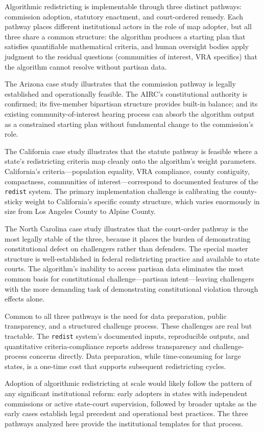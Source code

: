 \label{sec:conclusion}

Algorithmic redistricting is implementable through three distinct pathways:
commission adoption, statutory enactment, and court-ordered remedy.  Each
pathway places different institutional actors in the role of map adopter, but
all three share a common structure: the algorithm produces a starting plan
that satisfies quantifiable mathematical criteria, and human oversight bodies
apply judgment to the residual questions (communities of interest, VRA
specifics) that the algorithm cannot resolve without partisan data.

The Arizona case study illustrates that the commission pathway is legally
established and operationally feasible.  The AIRC's constitutional authority
is confirmed; its five-member bipartisan structure provides built-in balance;
and its existing community-of-interest hearing process can absorb the algorithm
output as a constrained starting plan without fundamental change to the
commission's role.

The California case study illustrates that the statute pathway is feasible
where a state's redistricting criteria map cleanly onto the algorithm's weight
parameters.  California's criteria---population equality, VRA compliance, county
contiguity, compactness, communities of interest---correspond to documented
features of the \texttt{redist} system.  The primary implementation challenge
is calibrating the county-sticky weight to California's specific county
structure, which varies enormously in size from Los Angeles County to
Alpine County.

The North Carolina case study illustrates that the court-order pathway is the
most legally stable of the three, because it places the burden of demonstrating
constitutional defect on challengers rather than defenders.  The special master
structure is well-established in federal redistricting practice and available
to state courts.  The algorithm's inability to access partisan data eliminates
the most common basis for constitutional challenge---partisan intent---leaving
challengers with the more demanding task of demonstrating constitutional
violation through effects alone.

Common to all three pathways is the need for data preparation, public
transparency, and a structured challenge process.  These challenges are
real but tractable.  The \texttt{redist} system's documented inputs, reproducible
outputs, and quantitative criteria-compliance reports address transparency and
challenge-process concerns directly.  Data preparation, while time-consuming
for large states, is a one-time cost that supports subsequent redistricting
cycles.

Adoption of algorithmic redistricting at scale would likely follow the pattern
of any significant institutional reform: early adopters in states with
independent commissions or active state-court supervision, followed by
broader uptake as the early cases establish legal precedent and operational
best practices.  The three pathways analyzed here provide the institutional
templates for that process.

